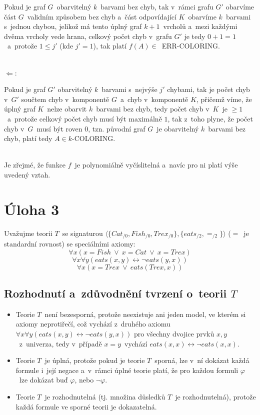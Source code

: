 \documentclass[a4paper, 11pt]{article}
\begin{document}
\noindent Pokud je graf $G$~obarvitelný $k$~barvami bez chyb, tak v~rámci grafu $G'$ obarvíme část $G$~validním způsobem bez chyb a~část odpovídající $K$~obarvíme $k$~barvami s~jednou chybou, jelikož má tento úplný graf $k + 1$~vrcholů a~mezi každými dvěma vrcholy vede hrana, celkový počet chyb v~grafu $G'$ je tedy $0 + 1 = 1$~a~protože $1 \leq j'$ (kde $j' = 1$), tak platí $f(A) \in$~ERR-COLORING.

\noindent \\ $\Leftarrow:$

\noindent Pokud je graf $G'$ obarvitelný $k$~barvami s~nejvýše $j'$ chybami, tak je počet chyb v~$G'$ součtem chyb v~komponentě $G$~a~chyb v~komponentě $K$, přičemž víme, že úplný graf $K$~nelze obarvit $k$~barvami bez chyb, tedy počet chyb v~$K$~je $\geq 1$~a~protože celkový počet chyb musí být maximálně $1$, tak z~toho plyne, že počet chyb v~$G$~musí být roven $0$, tzn. původní graf $G$~je obarvitelný $k$~barvami bez chyb, platí tedy $A \in k$-COLORING.

\noindent \\ Je zřejmé, že funkce $f$~je polynomiálně vyčíslitelná a~navíc pro ni platí výše uvedený vztah.

\newpage

\section*{Úloha 3}

Uvažujme teorii $T$~se signaturou $\langle \{ Cat_{/ 0}, Fish_{/ 0}, Trex_{/ 0} \}, \{ eats_{/ 2}, =_{/ 2} \} \rangle$ ($=$~je standardní rovnost) se speciálními axiomy:
$$\forall x(x = Fish\ \vee\ x = Cat\ \vee\ x = Trex)$$
$$\forall x \forall y(eats(x, y) \leftrightarrow \neg eats(y, x))$$
$$\forall x(x = Trex\ \vee\ eats(Trex, x))$$

\subsection*{Rozhodnutí a~zdůvodnění tvrzení o~teorii $T$}

\begin{itemize}
    \item[(a)] Teorie $T$~není bezesporná, protože neexistuje ani jeden model, ve kterém si axiomy neprotiřečí, což vychází z~druhého axiomu $\forall x \forall y(eats(x, y) \leftrightarrow \neg eats(y, x))$ pro všechny dvojice prvků $x, y$~z~univerza, tedy v~případě $x = y$~vychází $eats(x, x) \leftrightarrow \neg eats(x, x)$.
    \item[(b)] Teorie $T$~je úplná, protože pokud je teorie $T$~sporná, lze v~ní dokázat každá formule i~její negace a~v~rámci úplné teorie platí, že pro každou formuli $\varphi$~lze dokázat buď $\varphi$, nebo $\neg \varphi$.
    \item[(c)] Teorie $T$~je rozhodnutelná (tj. množina důsledků $T$~je rozhodnutelná), protože každá formule ve sporné teorii je dokazatelná.
\end{itemize}
\end{document}
